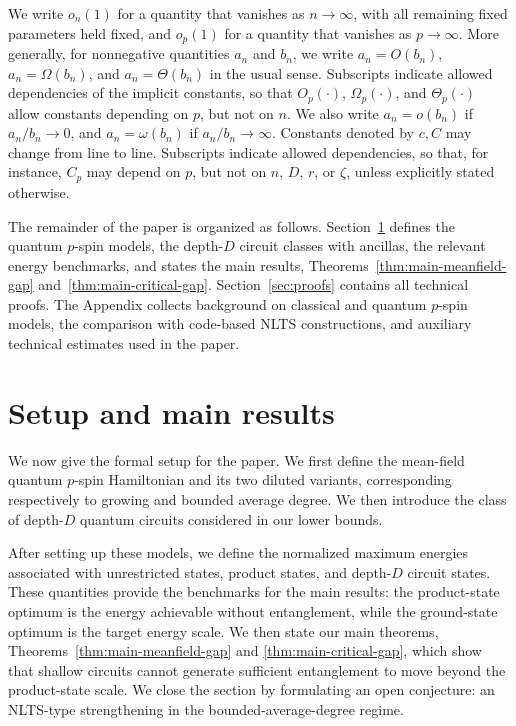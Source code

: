 \documentclass[12pt]{article}
\begin{document}
We write \(o_n(1)\) for a quantity that vanishes as \(n\to\infty\), with all
remaining fixed parameters held fixed, and \(o_p(1)\) for a quantity that
vanishes as \(p\to\infty\). More generally, for nonnegative quantities \(a_n\)
and \(b_n\), we write \(a_n=O(b_n)\), \(a_n=\Omega(b_n)\), and
\(a_n=\Theta(b_n)\) in the usual sense. Subscripts indicate allowed
dependencies of the implicit constants, so that \(O_p(\cdot)\),
\(\Omega_p(\cdot)\), and \(\Theta_p(\cdot)\) allow constants depending on
\(p\), but not on \(n\). We also write \(a_n=o(b_n)\) if \(a_n/b_n\to0\), and
\(a_n=\omega(b_n)\) if \(a_n/b_n\to\infty\). Constants denoted by \(c,C\) may change from line to line.
Subscripts indicate allowed dependencies, so that, for instance, \(C_p\) may depend on \(p\), but not on \(n\), \(D\), \(r\), or \(\zeta\), unless explicitly stated otherwise.

The remainder of the paper is organized as follows. 
Section~\ref{sec:setup-main-results} defines the quantum \(p\)-spin models, the depth-\(D\) circuit classes with ancillas, the relevant energy benchmarks, and states the main results, Theorems~\ref{thm:main-meanfield-gap} and~\ref{thm:main-critical-gap}. Section~\ref{sec:proofs} contains all technical proofs. The Appendix collects background on classical and quantum \(p\)-spin models, the comparison with code-based NLTS constructions, and auxiliary technical estimates used in the paper.


\section{Setup and main results}
\label{sec:setup-main-results}

We now give the formal setup for the paper. We first define the mean-field quantum \(p\)-spin Hamiltonian and its two diluted variants, corresponding respectively to growing and bounded average degree. We then introduce the class of depth-\(D\) quantum circuits considered in our lower bounds.

After setting up these models, we define the normalized maximum energies
associated with unrestricted states, product states, and depth-\(D\) circuit states. These quantities provide the benchmarks for the main results: the product-state optimum is the energy achievable without entanglement, while the ground-state optimum is the target energy scale. We then state our main
theorems, Theorems~\ref{thm:main-meanfield-gap} and
\ref{thm:main-critical-gap}, which show that shallow circuits cannot generate sufficient entanglement to move beyond the product-state scale. We close the section by formulating an open conjecture: an NLTS-type strengthening in the bounded-average-degree regime.
\end{document}
